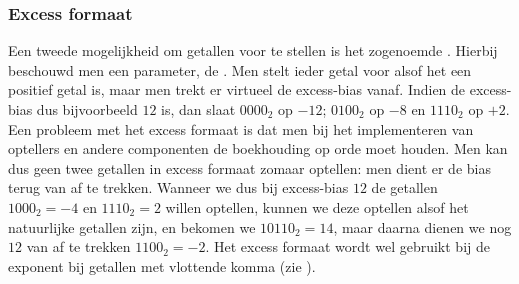 \subsubsection{Excess formaat}
Een tweede mogelijkheid om getallen voor te stellen is het zogenoemde . Hierbij beschouwd men een parameter, de . Men stelt ieder getal voor alsof het een positief getal is, maar men trekt er virtueel de excess-bias vanaf. Indien de excess-bias dus bijvoorbeeld $12$ is, dan slaat $0000_2$ op $-12$; $0100_2$ op $-8$ en $1110_2$ op $+2$. Een probleem met het excess formaat is dat men bij het implementeren van optellers en andere componenten de boekhouding op orde moet houden. Men kan dus geen twee getallen in excess formaat zomaar optellen: men dient er de bias terug van af te trekken. Wanneer we dus bij excess-bias $12$ de getallen $1000_2=-4$ en $1110_2=2$ willen optellen, kunnen we deze optellen alsof het natuurlijke getallen zijn, en bekomen we $10110_2=14$, maar daarna dienen we nog $12$ van af te trekken $1100_2=-2$. Het excess formaat wordt wel gebruikt bij de exponent bij getallen met vlottende komma (zie ).

